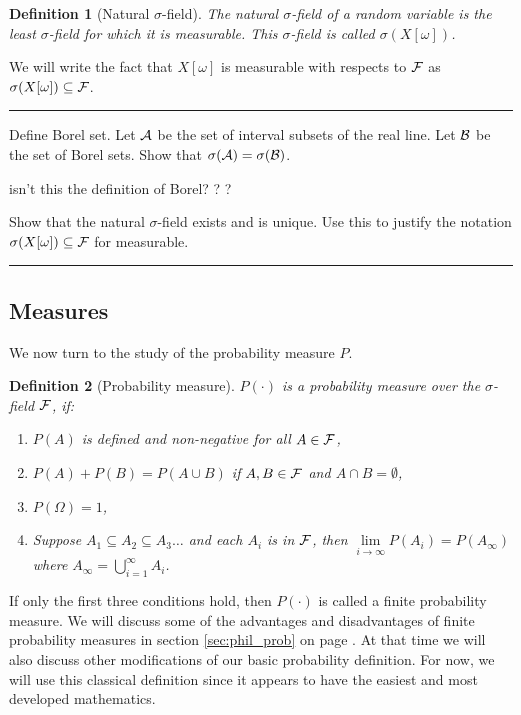 \documentclass[14pt]{extarticle}
\newtheorem{definition}{Definition}
\newenvironment{textHW}{
  \noindent\rule{\textwidth}{1pt}%
  \begin{list}{}{
      \setlength{\labelwidth}{1cm}
      \setlength{\labelsep}{0.3cm}
      \setlength{\leftmargin}{1.3cm}
      \setlength{\rightmargin}{1cm}
      \setlength{\parsep}{0.5ex plus0.2ex minus0.1ex}
      \setlength{\topsep}{1pt plus3pt minus1pt}
      \setlength{\itemsep}{0ex plus0.2ex} 
      \renewcommand{\makelabel}[1]{\label{thw:##1}{\ref{##1}}}
      \sl}}%
  {\end{list}\rule{\textwidth}{1pt}}
\newcommand{\notes}{}
\begin{document}
\begin{definition}[Natural $\sigma$-field]
  \label{def:natural_sigma_field} The natural $\sigma$-field of a
  random variable is the least $\sigma$-field for which it is
  measurable.  This $\sigma$-field is called
  $\sigma(X[\omega])$. 
\end{definition}

We will write the fact that $X[\omega]$ is measurable with respects
to ${\cal F}$ as $\sigma(X[\omega]) \subseteq {\cal F}$.  

\begin{textHW}
\item[hw:borel] {\notes Define Borel set.}  Let ${\cal A}$ be the set
  of interval subsets of the real line.  Let ${\cal B}$ be the set of
  Borel sets.  Show that $\sigma({\cal A}) = \sigma({\cal B})$. 

  {\notes isn't this the definition of Borel? ? ?}
 

\item[hw:natural_exist] Show that the natural $\sigma$-field exists
  and is unique.  Use this to justify the notation
  $\sigma(X[\omega]) \subseteq {\cal F}$ for measurable.
\end{textHW}
 
        \subsection{Measures}
%
We now turn to the study of the probability measure $P$.

\begin{definition}[Probability measure] $P(\cdot)$ is a probability
  measure over the $\sigma$-field ${\cal F}$, if:
  \begin{enumerate}
  \item $P(A)$ is defined and non-negative for all $A \in {\cal F}$,
  \item $P(A) + P(B) = P(A \cup B)$ if $A,B \in {\cal F}$ and $A
    \cap B = \emptyset$,
  \item $P(\Omega) = 1$,
  \item Suppose $A_1 \subseteq A_2 \subseteq A_3 \ldots $ and each
    $A_i$ is in ${\cal F}$, then $\lim\limits_{i \to \infty} P(A_i)
    = P(A_\infty)$ where $A_\infty = \bigcup\limits_{i=1}^\infty
    A_i$. 
  \end{enumerate}
\end{definition}
If only the first three conditions hold, then $P(\cdot)$ is called a
finite probability measure.  We will discuss some of the advantages
and disadvantages of finite probability measures in section
\ref{sec:phil_prob} on page \pageref{sec:phil_prob}.  At that time
we will also discuss other modifications of our basic probability
definition.  For now, we will use this classical definition since it
appears to have the easiest and most developed mathematics.
\end{document}
